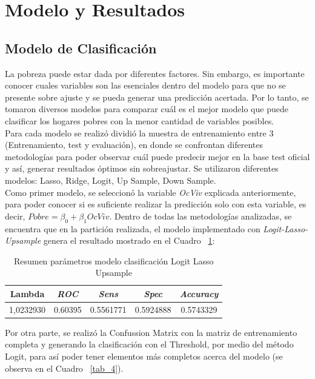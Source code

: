 \documentclass[conference, 10pt]{IEEEtran}
\begin{document}
\section{Modelo y Resultados}
\subsection{Modelo de Clasificación}
La pobreza puede estar dada por diferentes factores. Sin embargo, es importante conocer cuales variables son las esenciales dentro del modelo para que no se presente sobre ajuste y se pueda generar una predicción acertada. Por lo tanto, se tomaron diversos modelos para comparar cuál es el mejor  modelo que puede clasificar los hogares pobres con la menor cantidad de variables posibles.\\
Para cada modelo se realizó dividió la muestra de entrenamiento entre 3 (Entrenamiento, test y evaluación), en donde se confrontan diferentes metodologías para poder observar cuál puede predecir mejor en la base test oficial y así, generar resultados óptimos sin sobreajustar. Se utilizaron diferentes modelos: Lasso, Ridge, Logit, Up Sample, Down Sample.\\ 
Como primer modelo, se seleccionó la variable \textit{OcViv} explicada anteriormente, para poder conocer si es suficiente realizar la predicción solo con esta variable, es decir, $Pobre=\beta_0+\beta_{1}OcViv$. Dentro de todas las metodologías analizadas, se encuentra que en la partición realizada, el modelo implementado con \textit{Logit-Lasso-Upsample} genera el resultado mostrado en el Cuadro ~\ref{tab_3}: 

\begin{table}[htbp]
\caption{Resumen parámetros modelo clasificación Logit Lasso Upsample}
\begin{center}
\begin{tabular}{|c|c|c|c|c|}
\hline
\textbf{Lambda} & \textbf{\textit{ROC}}& \textbf{\textit{Sens}} & \textbf{\textit{Spec}}& \textbf{\textit{Accuracy}}\\
\hline
1,0232930 & 0.60395 &0.5561771 &0.5924888 &0.5743329 \\
\hline
\end{tabular}
\label{tab_3}
\end{center}
\end{table}

Por otra parte, se realizó la Confussion Matrix con la matriz de entrenamiento completa y generando la clasificación con el Threshold, por medio del método Logit,  para así poder tener elementos más completos acerca del modelo (se observa en el Cuadro ~\ref{tab_4}).
\end{document}

